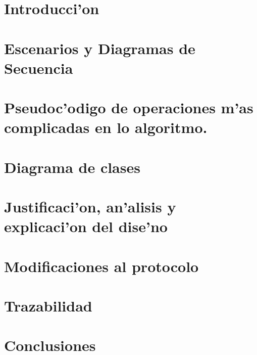 \documentclass[spanish, a4paper, 10pt, titlepage]{article}
\author{Echevarr'ia - Farjat - Freijo - Giusto}
\begin{document}

\tableofcontents
\clearpage



\section{Introducci'on}

\clearpage
 
\section{Escenarios y Diagramas de Secuencia}

\clearpage

\section{Pseudoc'odigo de operaciones m'as complicadas en lo algoritmo.}



\section{Diagrama de clases}

\clearpage

\section{Justificaci'on, an'alisis y explicaci'on del dise'no}

\clearpage

\section{\label{ModificacionesAlProtocolo}Modificaciones al protocolo}

\clearpage


\section{Trazabilidad}

\clearpage

\section{Conclusiones}

\clearpage
\end{document}
